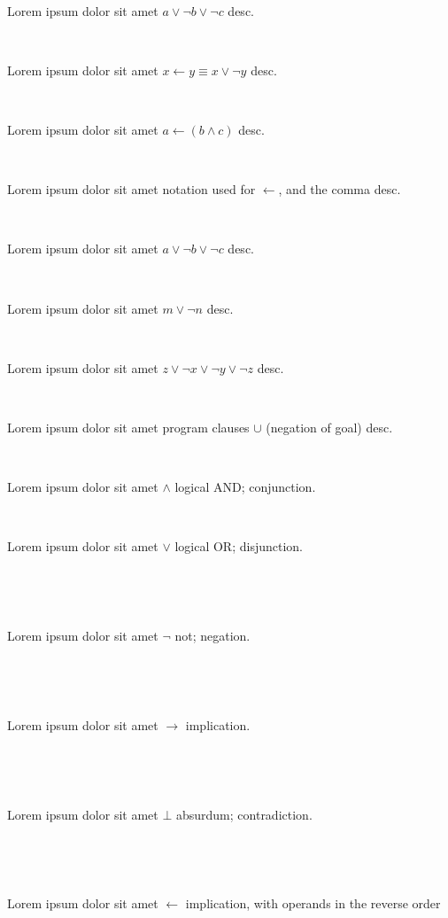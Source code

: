 \documentclass[12pt]{article}
\begin{document}
\centerline{~}

Lorem ipsum dolor sit amet $ a \vee \neg b \vee \neg c $ desc.

\centerline{~}

Lorem ipsum dolor sit amet $ x \leftarrow y \equiv x \vee \neg y $ desc.

\centerline{~}

Lorem ipsum dolor sit amet $ a \leftarrow ( b \wedge c ) $ desc.

\centerline{~}

Lorem ipsum dolor sit amet notation used for $ \leftarrow $, and the comma  desc.

\centerline{~}

Lorem ipsum dolor sit amet $ a \vee \neg b \vee \neg c $ desc.

\centerline{~}

Lorem ipsum dolor sit amet $ m \vee \neg n $ desc.

\centerline{~}

Lorem ipsum dolor sit amet $ z \vee \neg x \vee \neg y \vee \neg z $ desc.

\centerline{~}

Lorem ipsum dolor sit amet program clauses $ \cup $ (negation of goal) desc.


\centerline{~}

Lorem ipsum dolor sit amet $ \wedge $ logical AND; conjunction.

\centerline{~}

Lorem ipsum dolor sit amet $ \vee $ logical OR; disjunction.

\centerline{~}

\centerline{~}

Lorem ipsum dolor sit amet $ \neg $ not; negation.

\centerline{~}

\centerline{~}

Lorem ipsum dolor sit amet $ \rightarrow $ implication.

\centerline{~}

\centerline{~}

Lorem ipsum dolor sit amet $ \bot $ absurdum; contradiction.

\centerline{~}

\centerline{~}

Lorem ipsum dolor sit amet $ \leftarrow  $ implication, with operands in the reverse order

\centerline{~}

\centerline{~}
\end{document}
